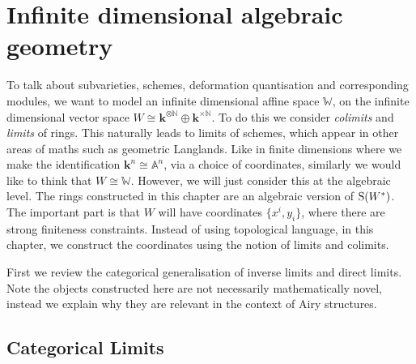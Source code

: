     \chapter{Infinite dimensional algebraic geometry} 
    
    \label{chapter:infalg} 
    
    To talk about subvarieties, schemes, deformation quantisation and corresponding modules, we want to model an infinite dimensional affine space \(\mathbb{W}\), on the infinite dimensional vector space \( W \cong \mathbf{k}^{\otimes \mathbb{N}} \oplus \mathbf{k}^{\times \mathbb{N}} \). To do this we consider \emph{colimits} and \emph{limits} of rings. This naturally leads to limits of schemes, which appear in other areas of maths such as geometric Langlands. Like in finite dimensions where we make the identification  \( \mathbf{k}^n \cong \mathbb{A}^n\), via a choice of coordinates, similarly we would like to think that \(W \cong \mathbb{W}\). However, we will just consider this at the algebraic level. The rings constructed in this chapter are an algebraic version of \( \mathrm{S}(W^*)\). The important part is that \(W\) will have coordinates \(\{x^i, y_i\}\), where there are strong finiteness constraints. Instead of using topological language, in this chapter, we construct the coordinates using the notion of limits and colimits.
    
    First we review the categorical generalisation of inverse limits and direct limits. Note the objects constructed here are not necessarily mathematically novel, instead we explain why they are relevant in the context of Airy structures.
    
    
    
    \section{Categorical Limits}
    
